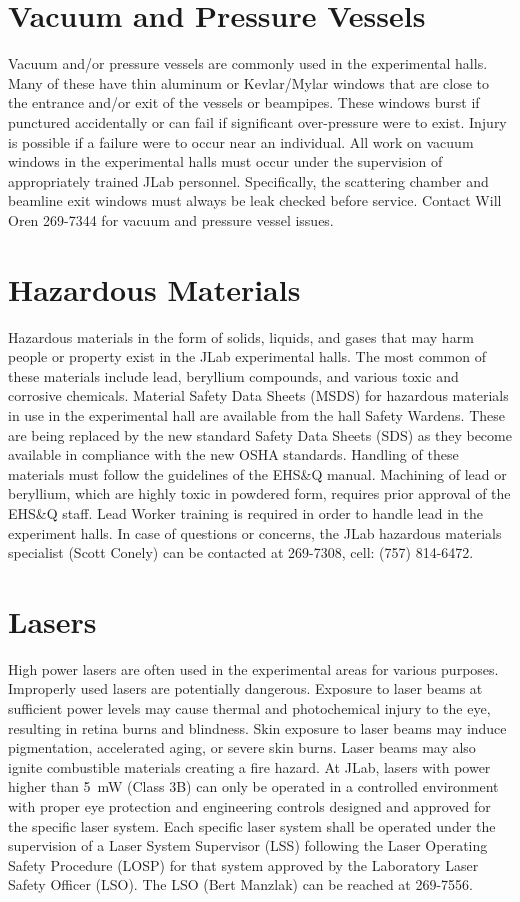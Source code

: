 \documentclass[11pt]{report}
\begin{document}
\section{Vacuum and Pressure Vessels}

Vacuum and/or pressure vessels are commonly used in the experimental halls. Many 
of these have thin aluminum or Kevlar/Mylar windows that are close to the entrance 
and/or exit of the vessels or beampipes. These windows burst if punctured accidentally 
or can fail if significant over-pressure were to exist. Injury is possible if a failure 
were to occur near an individual. All work on vacuum windows in the experimental halls 
must occur under the supervision of appropriately trained JLab personnel. Specifically, 
the scattering chamber and beamline exit windows must always be leak checked before 
service. Contact Will Oren 269-7344 for vacuum and pressure vessel issues.

\section{Hazardous Materials}

Hazardous materials in the form of solids, liquids, and gases that may harm people or 
property exist in the JLab experimental halls. The most common of these materials 
include lead, beryllium compounds, and various toxic and corrosive chemicals. Material 
Safety Data Sheets (MSDS) for hazardous materials in use in the experimental hall are 
available from the hall Safety Wardens. These are being replaced by the new standard
Safety Data Sheets (SDS) as they become available in compliance with the new OSHA 
standards. Handling of these materials must follow the guidelines of the EHS\&Q manual. 
Machining of lead or beryllium, which are highly toxic in powdered form, requires prior 
approval of the EHS\&Q staff. Lead Worker training is required in order to handle lead in 
the experiment halls. In case of questions or concerns, the JLab hazardous materials 
specialist (Scott Conely) can be contacted at 269-7308, cell: (757) 814-6472.

\section{Lasers}

High power lasers are often used in the experimental areas for various purposes. Improperly 
used lasers are potentially dangerous. Exposure to laser beams at sufficient power levels 
may cause thermal and photochemical injury to the eye, resulting in retina burns and 
blindness. Skin exposure to laser beams may induce pigmentation, accelerated aging, or 
severe skin burns. Laser beams may also ignite combustible materials creating a fire hazard. 
At JLab, lasers with power higher than 5~mW (Class 3B) can only be operated in a controlled 
environment with proper eye protection and engineering controls designed and approved for the 
specific laser system. Each specific laser system shall be operated under the supervision of 
a Laser System Supervisor (LSS) following the Laser Operating Safety Procedure (LOSP) for 
that system approved by the Laboratory Laser Safety Officer (LSO). The LSO (Bert Manzlak) can 
be reached at 269-7556.
%
%
\end{document}
